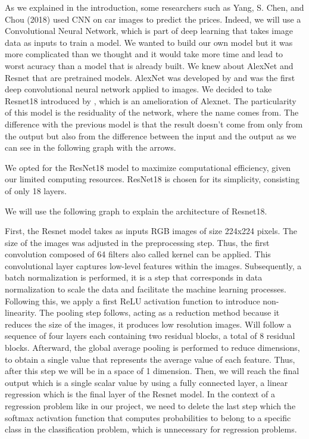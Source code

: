 \documentclass[12pt]{article}
\begin{document}
\noindent As we explained in the introduction, some researchers such as Yang, S. Chen, and Chou (2018) used CNN on car images to predict the prices. 
Indeed, we will use a Convolutional Neural Network, which is part of deep learning that takes image data as inputs to train a model.
We wanted to build our own model but it was more complicated than we thought and it would take more time and lead to worst acuracy than a model that is already built. We knew about AlexNet and Resnet that are pretrained models. AlexNet was developed by \cite{Krizhevsky2012} and was the first deep convolutional neural network applied to images. We decided to take Resnet18 introduced by \cite{Kaiming2016}, which is an amelioration of Alexnet. The particularity of this model is the residuality of the network, where the name comes from. The difference with the previous model is that the result doesn't come from only from the output but also from the difference between the input and the output as we can see in the following graph with the arrows.

\noindent We opted for the ResNet18 model to maximize computational efficiency, given our limited computing resources. ResNet18 is chosen for its simplicity, consisting of only 18 layers.

\noindent We will use the following graph to explain the architecture of Resnet18.



\noindent First, the Resnet model takes as inputs RGB images of size 224x224 pixels. The size of the images was adjusted in the preprocessing step. Thus, the first convolution composed of 64 filters also called kernel can be applied. This convolutional layer captures low-level features within the images. Subsequently, a batch normalization is performed, it is a step that corresponds in data normalization to scale the data and facilitate the machine learning processes. Following this, we apply a first ReLU activation function to introduce non-linearity. The pooling step follows, acting as a reduction method because it reduces the size of the images, it produces low resolution images. 
Will follow a sequence of four layers each containing two residual blocks, a total of 8 residual blocks.
Afterward, the global average pooling is performed to reduce dimensions, to obtain a single value that represents the average value of each feature. Thus, after this step we will be in a space of 1 dimension. Then, we will reach the final output which is a single scalar value by using a fully connected layer, a linear regression which is the final layer of the Resnet model. In the context of a regression problem like in our project, we need to delete the last step which the softmax activation function that computes probabilities to belong to a specific class in the classification problem, which is unnecessary for regression problems.
\end{document}
